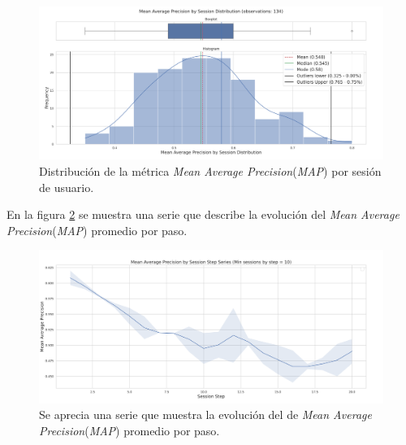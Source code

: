 \documentclass[11pt,a4paper,twoside]{thesis}
\begin{document}
\begin{figure}[H]
	\centering
	\includegraphics[width=15cm]{./images/llama2/mean_average_precision_by_session_distribution.png}
	\caption{Distribución de la métrica \textit{Mean Average Precision}(\textit{MAP}) por sesión de usuario.}
	\label{fig:llama2-mean_average_precision_by_session_distribution}
\end{figure}

\clearpage

En la figura \ref{fig:llama2-mean_average_precision_by_session_step_series} se muestra una serie que describe la evolución  del \textit{Mean Average Precision}(\textit{MAP}) promedio por paso.

\begin{figure}[H]
	\centering
	\includegraphics[width=15cm]{./images/llama2/mean_average_precision_by_session_step_series.png}
	\caption{
		Se aprecia una serie que muestra la evolución del de \textit{Mean Average Precision}(\textit{MAP}) promedio por paso.}
	\label{fig:llama2-mean_average_precision_by_session_step_series}
\end{figure}
\end{document}
